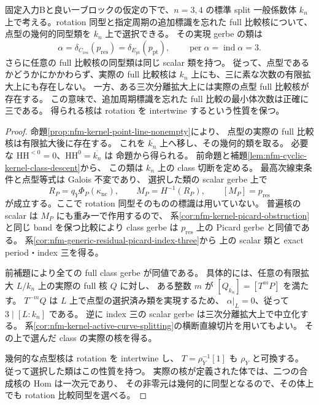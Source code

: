 \begin{theorem}
\label{thm:nfm-low-dimensional-full-class-index-three}
固定入力Bと良い一ブロックの仮定の下で、$n=3,4$ の標準 split 一般係数体
$k_n$ 上で考える。rotation 同型と指定周期の追加標識を忘れた full 比較核について、
点型の幾何的同型類を $k_n$ 上で選択できる。
その実現 gerbe の類は
\[
 \alpha=\delta_{C_{\mathrm{res}}}(p_{\mathrm{res}})
        =\delta_{E_{\mathrm{pt}}}(p_{\mathrm{pt}}),
 \qquad \operatorname{per}\alpha=\operatorname{ind}\alpha=3.
\]
さらに任意の full 比較核の同型類は同じ scalar 類を持つ。
従って、点型であるかどうかにかかわらず、実際の full 比較核は
$k_n$ 上にも、三に素な次数の有限拡大上にも存在しない。
一方、ある三次分離拡大上には実際の点型 full 比較核が存在する。
この意味で、追加周期標識を忘れた full 比較の最小体次数は正確に三である。
得られる核は rotation を intertwine するという性質を保つ。
\end{theorem}

\begin{proof}
命題\ref{prop:nfm-kernel-point-line-nonempty}により、
点型の実際の full 比較核は有限拡大後に存在する。
これを $\overline{k_n}$ 上へ移し、その幾何的類を取る。
必要な $\mathrm{HH}^{<0}=0$、$\mathrm{HH}^0=\overline{k_n}$ は
命題から得られる。
前命題と補題\ref{lem:nfm-cyclic-kernel-class-descent}から、
この類は $k_n$ 上の class 切断を定める。
最高次線束条件と点型等式は Galois 不変であり、
選択した類の scalar gerbe 上で
\[
 R_P=q_Y\Phi_P(\kappa_{\mathrm{nc}}),\qquad
 M_P=H^{-1}(R_P),\qquad [M_P]=p_{\mathrm{res}}
\]
が成立する。ここで rotation 同型そのものの標識は用いていない。
普遍核の scalar は $M_P$ にも重み一で作用するので、
系\ref{cor:nfm-kernel-picard-obstruction}と同じ band を保つ比較により
class gerbe は $p_{\mathrm{res}}$ 上の Picard gerbe と同値である。
系\ref{cor:nfm-generic-residual-picard-index-three}から
上の scalar 類と exact period・index 三を得る。

前補題により全ての full class gerbe が同値である。
具体的には、任意の有限拡大 $L/k_n$ 上の実際の full 核 $Q$ に対し、
ある整数 $m$ が $[Q_{\overline{k_n}}]=[T^mP]$ を満たす。
$T^{-m}Q$ は $L$ 上で点型の選択済み類を実現するため、
$\alpha|_L=0$、従って $3\mid[L:k_n]$ である。
逆に index 三の scalar gerbe は三次分離拡大上で中立化する。
系\ref{cor:nfm-kernel-active-curve-splitting}の横断直線切片を用いてもよい。
その上で選んだ class の実際の核を得る。

幾何的な点型核は rotation を intertwine し、
$T=\rho_Y^{-1}[1]$ も $\rho_Y$ と可換する。
従って選択した類はこの性質を持つ。
実際の核が定義された体では、二つの合成核の Hom は一次元であり、
その非零元は幾何的に同型となるので、その体上でも rotation 比較同型を選べる。
\end{proof}


